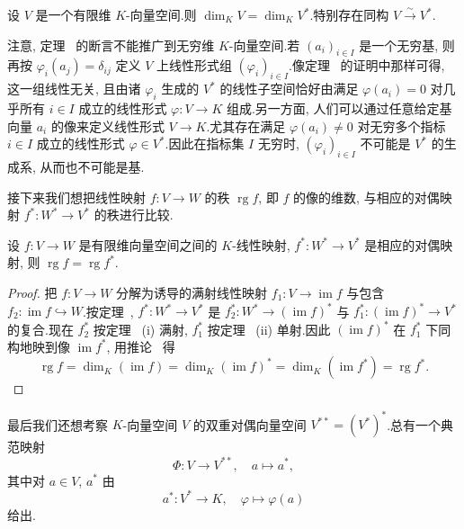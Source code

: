 \begin{corollary}\label{cor:2.3.6}
设 $V$ 是一个有限维 $K$-向量空间.则 $\dim_K V = \dim_K V^*$.特别存在同构 $V \overset{\sim}{\longrightarrow} V^*$.
\end{corollary}

注意, 定理~ 的断言不能推广到无穷维 $K$-向量空间.若 $(a_i)_{i \in I}$ 是一个无穷基, 则再按 $\varphi_i(a_j) = \delta_{ij}$ 定义 $V$ 上线性形式组 $(\varphi_i)_{i \in I}$.像定理~ 的证明中那样可得, 这一组线性无关, 且由诸 $\varphi_i$ 生成的 $V^*$ 的线性子空间恰好由满足 $\varphi(a_i) = 0$ 对几乎所有 $i \in I$ 成立的线性形式 $\varphi \colon V \longrightarrow K$ 组成.另一方面, 人们可以通过任意给定基向量 $a_i$ 的像来定义线性形式 $V \longrightarrow K$.尤其存在满足 $\varphi(a_i) \neq 0$ 对无穷多个指标 $i \in I$ 成立的线性形式 $\varphi \in V^*$.因此在指标集 $I$ 无穷时, $(\varphi_i)_{i \in I}$ 不可能是 $V^*$ 的生成系, 从而也不可能是基.

接下来我们想把线性映射 $f \colon V \longrightarrow W$ 的秩 $\operatorname{rg} f$, 即 $f$ 的像的维数, 与相应的对偶映射 $f^* \colon W^* \longrightarrow V^*$ 的秩进行比较.

\begin{theorem}\label{thm:2.3.7}
设 $f \colon V \longrightarrow W$ 是有限维向量空间之间的 $K$-线性映射, $f^* \colon W^* \longrightarrow V^*$ 是相应的对偶映射, 则 $\operatorname{rg} f = \operatorname{rg} f^*$.
\end{theorem}

\begin{proof}
把 $f \colon V \longrightarrow W$ 分解为诱导的满射线性映射 $f_1 \colon V \longrightarrow \operatorname{im} f$ 与包含 $f_2 \colon \operatorname{im} f \hookrightarrow W$.按定理~, $f^* \colon W^* \longrightarrow V^*$ 是 $f_2^* \colon W^* \longrightarrow (\operatorname{im} f)^*$ 与 $f_1^* \colon (\operatorname{im} f)^* \longrightarrow V^*$ 的复合.现在 $f_2^*$ 按定理~ (i) 满射, $f_1^*$ 按定理~ (ii) 单射.因此 $(\operatorname{im} f)^*$ 在 $f_1^*$ 下同构地映到像 $\operatorname{im} f^*$, 用推论~ 得
\[
\operatorname{rg} f = \dim_K(\operatorname{im} f) = \dim_K(\operatorname{im} f)^* = \dim_K(\operatorname{im} f^*) = \operatorname{rg} f^*\text{.}
\]
\end{proof}

最后我们还想考察 $K$-向量空间 $V$ 的双重对偶向量空间 $V^{**} = (V^*)^*$.总有一个典范映射
\[
\Phi \colon V \longrightarrow V^{**}, \quad a \longmapsto a^*,
\]
其中对 $a \in V$, $a^*$ 由
\[
a^* \colon V^* \longrightarrow K, \quad \varphi \longmapsto \varphi(a)
\]
给出.

